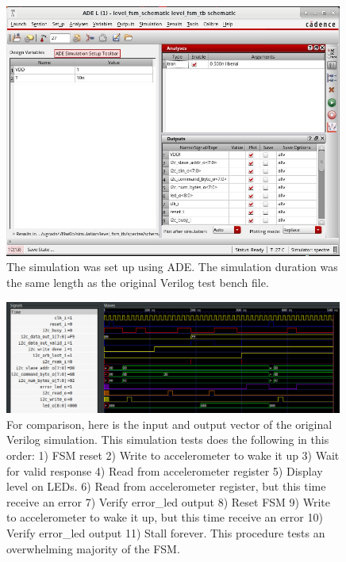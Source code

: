 \documentclass[11pt]{article}
\begin{document}
\begin{figure}[H]
    \centering
\includegraphics[width=0.99\textwidth]{simsetup.png}
    \caption{The simulation was set up using ADE. The simulation duration was the same length as the original Verilog test bench file.}
\end{figure}
\pagebreak


\begin{figure}[H]
    \centering
\includegraphics[width=0.99\textwidth]{verilogtb.png}
    \caption{For comparison, here is the input and output vector of the original Verilog simulation. This simulation tests does the following in this order: 1) FSM reset 2) Write to accelerometer to wake it up 3) Wait for valid response 4) Read from accelerometer register 5) Display level on LEDs. 6) Read from accelerometer register, but this time receive an error 7) Verify error\_led output 8) Reset FSM 9) Write to accelerometer to wake it up, but this time receive an error 10) Verify error\_led output 11) Stall forever. This procedure tests an overwhelming majority of the FSM.}
\end{figure}
\end{document}
